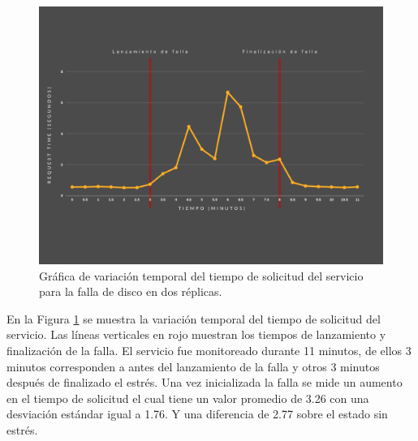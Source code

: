 \begin{figure}[htpb!]
	\centering
	\includegraphics[width=0.95\columnwidth]{images/graficasexperimentos/Disco2.png}
	\caption{Gráfica de variación temporal del tiempo de solicitud del servicio para la falla de disco en dos r\'eplicas.}
	\label{fig:disco02}
\end{figure}




\par En la Figura \ref{fig:disco02} se muestra la variación temporal del tiempo de solicitud del servicio. Las líneas verticales en rojo muestran los tiempos de lanzamiento y finalización de la falla. El servicio fue monitoreado durante 11 minutos, de ellos 3 minutos corresponden a antes del lanzamiento de la falla y otros 3 minutos después de finalizado el estrés. Una vez inicializada la falla se mide un aumento en el tiempo de solicitud el cual tiene un valor promedio de 3.26 con una desviación estándar igual a 1.76. Y una diferencia de 2.77 sobre el estado sin estrés.\\

